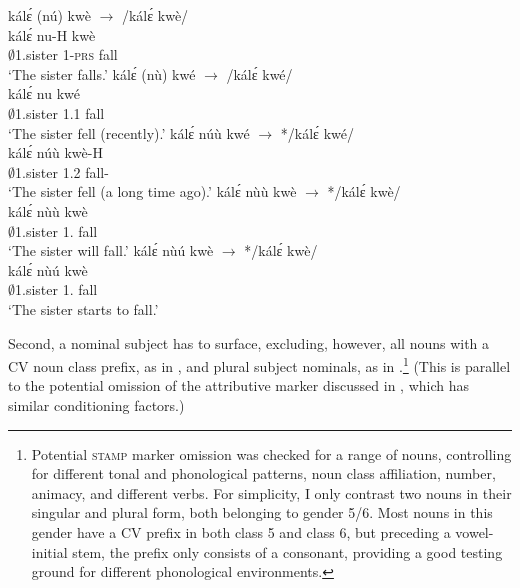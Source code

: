 \ea \label{SCOPOMtense}
  \ea  \label{SCOPOMtense1}
  \glll  kálɛ́ (nú) kwè $\rightarrow$ /kálɛ́ kwè/ \\
         kálɛ́ nu-H kwè \\
              $\emptyset$1.sister 1-\textsc{prs} fall \\
    \trans `The sister falls.'
\ex\label{SCOPOMtense2}
  \glll  kálɛ́ (nù) kwé $\rightarrow$ /kálɛ́ kwé/ \\
          kálɛ́ nu kwé  \\
              $\emptyset$1.sister 1.{\PST}1 fall \\
    \trans `The sister fell (recently).'
\ex \label{SCOPOMtense3}
  \glll  kálɛ́ núù kwé $\rightarrow$ */kálɛ́ kwé/ \\
       kálɛ́ núù kwè-H  \\
              $\emptyset$1.sister 1.{\PST}2 fall-{\PST} \\
    \trans `The sister fell (a long time ago).'
\ex\label{SCOPOMtense4}
  \glll  kálɛ́ nùù kwè $\rightarrow$ */kálɛ́ kwè/ \\
          kálɛ́ nùù kwè \\
              $\emptyset$1.sister 1.{\FUT} fall \\
    \trans `The sister will fall.'
\ex\label{SCOPOMtense5}
  \glll  kálɛ́ nùú kwè $\rightarrow$ */kálɛ́ kwè/ \\
        kálɛ́ nùú kwè \\
              $\emptyset$1.sister 1.{\INCH} fall \\
    \trans `The sister starts to fall.'
\z
\z

Second, a nominal subject has to surface, excluding, however, all nouns with a CV noun class prefix, as in , and plural subject nominals, as in .\footnote{Potential \textsc{stamp} marker omission was checked for a range of nouns, controlling for different tonal and phonological patterns, noun class affiliation, number, animacy, and different verbs. For simplicity, I only contrast two nouns in their singular and plural form, both belonging to gender 5/6. Most nouns in this gender have a CV prefix in both class 5 and class 6, but preceding a vowel-initial stem, the prefix only consists of a consonant, providing a good testing ground for different phonological environments.} (This is parallel to the potential omission of the attributive marker discussed in , which has similar conditioning factors.)



